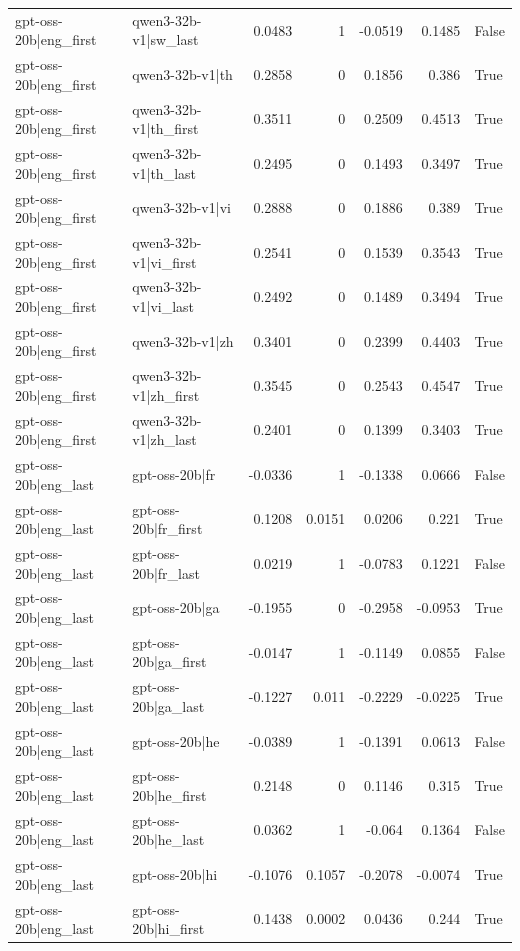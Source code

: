 \begin{table}
\begin{tabular}{l l r r r r l}
gpt-oss-20b|eng_first & qwen3-32b-v1|sw_last & 0.0483 & 1 & -0.0519 & 0.1485 & False \\
gpt-oss-20b|eng_first & qwen3-32b-v1|th & 0.2858 & 0 & 0.1856 & 0.386 & True \\
gpt-oss-20b|eng_first & qwen3-32b-v1|th_first & 0.3511 & 0 & 0.2509 & 0.4513 & True \\
gpt-oss-20b|eng_first & qwen3-32b-v1|th_last & 0.2495 & 0 & 0.1493 & 0.3497 & True \\
gpt-oss-20b|eng_first & qwen3-32b-v1|vi & 0.2888 & 0 & 0.1886 & 0.389 & True \\
gpt-oss-20b|eng_first & qwen3-32b-v1|vi_first & 0.2541 & 0 & 0.1539 & 0.3543 & True \\
gpt-oss-20b|eng_first & qwen3-32b-v1|vi_last & 0.2492 & 0 & 0.1489 & 0.3494 & True \\
gpt-oss-20b|eng_first & qwen3-32b-v1|zh & 0.3401 & 0 & 0.2399 & 0.4403 & True \\
gpt-oss-20b|eng_first & qwen3-32b-v1|zh_first & 0.3545 & 0 & 0.2543 & 0.4547 & True \\
gpt-oss-20b|eng_first & qwen3-32b-v1|zh_last & 0.2401 & 0 & 0.1399 & 0.3403 & True \\
gpt-oss-20b|eng_last & gpt-oss-20b|fr & -0.0336 & 1 & -0.1338 & 0.0666 & False \\
gpt-oss-20b|eng_last & gpt-oss-20b|fr_first & 0.1208 & 0.0151 & 0.0206 & 0.221 & True \\
gpt-oss-20b|eng_last & gpt-oss-20b|fr_last & 0.0219 & 1 & -0.0783 & 0.1221 & False \\
gpt-oss-20b|eng_last & gpt-oss-20b|ga & -0.1955 & 0 & -0.2958 & -0.0953 & True \\
gpt-oss-20b|eng_last & gpt-oss-20b|ga_first & -0.0147 & 1 & -0.1149 & 0.0855 & False \\
gpt-oss-20b|eng_last & gpt-oss-20b|ga_last & -0.1227 & 0.011 & -0.2229 & -0.0225 & True \\
gpt-oss-20b|eng_last & gpt-oss-20b|he & -0.0389 & 1 & -0.1391 & 0.0613 & False \\
gpt-oss-20b|eng_last & gpt-oss-20b|he_first & 0.2148 & 0 & 0.1146 & 0.315 & True \\
gpt-oss-20b|eng_last & gpt-oss-20b|he_last & 0.0362 & 1 & -0.064 & 0.1364 & False \\
gpt-oss-20b|eng_last & gpt-oss-20b|hi & -0.1076 & 0.1057 & -0.2078 & -0.0074 & True \\
gpt-oss-20b|eng_last & gpt-oss-20b|hi_first & 0.1438 & 0.0002 & 0.0436 & 0.244 & True \\

\end{tabular}
\end{table}
